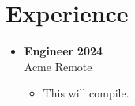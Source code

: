 \documentclass[letterpaper,10pt]{article}
\newcommand{\resumeItem}[1]{\item #1}
\newcommand{\resumeSubheading}[4]{\item \textbf{#1} \hfill \textbf{#2}\\ #3 \hfill #4}
\begin{document}
\section{Experience}
\begin{itemize}
  \resumeSubheading{Engineer}{2024}{Acme}{Remote}
    \begin{itemize}
      \resumeItem{This will compile.}
    \end{itemize}
\end{itemize}

\end{document}
